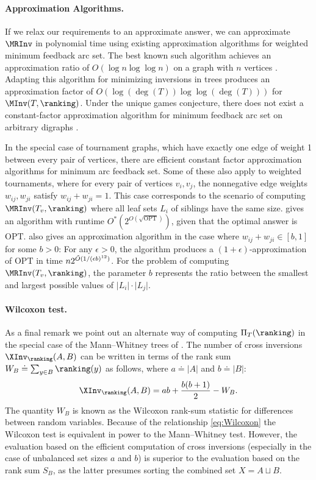 \paragraph{Approximation Algorithms.} If we relax our requirements to an approximate answer, we can approximate $\MRInv$ in polynomial time using existing approximation algorithms for weighted minimum feedback arc set. The best known such algorithm achieves an approximation ratio of $O(\log n\log\log n)$ on a graph with $n$ vertices \cite{ENSS98}. Adapting this algorithm for minimizing inversions in trees produces an approximation factor of $O(\log (\deg(T)) \log\log (\deg(T)))$ for $\MInv(T,\ranking)$. Under the unique games conjecture, there does not exist a constant-factor approximation algorithm for minimum feedback arc set on arbitrary digraphs \cite{GHMRC11}.

In the special case of tournament graphs, which have exactly one edge of weight 1 between every pair of vertices, there are efficient constant factor approximation algorithms for minimum arc feedback set. Some of these also apply to weighted tournaments, where for every pair of vertices $v_i,v_j$, the nonnegative edge weights $w_{ij},w_{ji}$ satisfy $w_{ij}+w_{ji}=1$. This case corresponds to the scenario of computing $\MRInv(T_v,\ranking)$ where all leaf sets $L_i$ of siblings have the same size. \cite{KS10} gives an algorithm with runtime $O^*(2^{O(\sqrt{\mathrm{OPT}})})$, given that the optimal answer is $\mathrm{OPT}$. \cite{KMS07} also gives an approximation algorithm in the case where $w_{ij}+w_{ji}\in [b,1]$ for some $b>0$: For any $\epsilon>0$, the algorithm produces a $(1+\epsilon)$-approximation of $\mathrm{OPT}$ in time $n 2^{\Tilde{O}(1/(\epsilon b)^{12}) }$. For the problem of computing $\MRInv(T_v,\ranking)$, the parameter $b$ represents the ratio between the smallest and largest possible values of $\lvert L_i\rvert\cdot\lvert L_j\rvert$.

\paragraph{Wilcoxon test.} As a final remark we point out an alternate way of computing $\Pi_T(\ranking)$ in the special case of the Mann--Whitney trees of . The number of cross inversions $\XInv_\ranking(A,B)$ can be written in terms of the rank sum $W_B \doteq \sum_{y \in B} \ranking(y)$ as follows, where $a \doteq |A|$ and $b \doteq |B|$:
\begin{equation}\label{eq:Wilcoxon}
\XInv_\ranking(A,B) = ab + \frac{b(b+1)}{2} - W_B.
\end{equation}
The quantity $W_B$ is known as the Wilcoxon rank-sum statistic for differences between random variables. Because of the relationship \eqref{eq:Wilcoxon} the Wilcoxon test is equivalent in power to the Mann--Whitney test. However, the evaluation based on the efficient computation of cross inversions (especially in the case of unbalanced set sizes $a$ and $b$) is superior to the evaluation based on the rank sum $S_B$, as the latter presumes sorting the combined set $X = A \sqcup B$.




